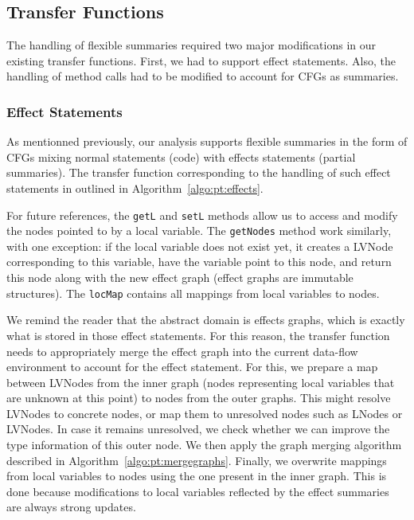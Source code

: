 \documentclass[a4paper]{article}
\begin{document}
\subsection{Transfer Functions}
The handling of flexible summaries required two major modifications in our
existing transfer functions. First, we had to support effect statements.
Also, the handling of method calls had to be modified to account for CFGs as
summaries.

\subsubsection{Effect Statements}
As mentionned previously, our analysis supports flexible summaries in the form
of CFGs mixing normal statements (code) with effects statements (partial
summaries). The transfer function corresponding to the handling of such effect
statements in outlined in Algorithm~\ref{algo:pt:effects}.

For future references, the \verb=getL= and \verb=setL= methods allow us to
access and modify the nodes pointed to by a local variable. The \verb=getNodes=
method work similarly, with one exception: if the local variable does not exist
yet, it creates a LVNode corresponding to this variable, have the variable
point to this node, and return this node along with the new effect graph
(effect graphs are immutable structures). The \verb=locMap= contains all
mappings from local variables to nodes.

We remind the reader that the abstract domain is effects graphs, which is
exactly what is stored in those effect statements. For this reason, the
transfer function needs to appropriately merge the effect graph into the
current data-flow environment to account for the effect statement. For this,
we prepare a map between LVNodes from the inner graph (nodes representing local
variables that are unknown at this point) to nodes from the outer graphs. This
might resolve LVNodes to concrete nodes, or map them to unresolved nodes such
as LNodes or LVNodes. In case it remains unresolved, we check whether we can improve
the type information of this outer node. We then apply the graph merging
algorithm described in Algorithm~\ref{algo:pt:mergegraphs}. Finally, we
overwrite mappings from local variables to nodes using the one present in the
inner graph. This is done because modifications to local variables reflected by
the effect summaries are always strong updates.
\end{document}

